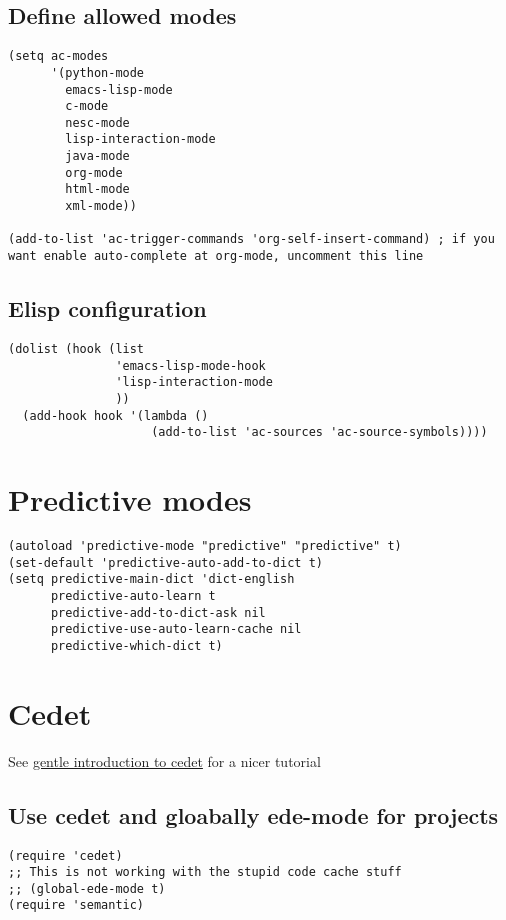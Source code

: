 \documentclass[11pt]{article}
\begin{document}
\subsection{Define allowed modes}
\label{sec-28.4}

\begin{verbatim}
(setq ac-modes 
      '(python-mode
        emacs-lisp-mode
        c-mode
        nesc-mode
        lisp-interaction-mode
        java-mode
        org-mode
        html-mode
        xml-mode))

(add-to-list 'ac-trigger-commands 'org-self-insert-command) ; if you want enable auto-complete at org-mode, uncomment this line
\end{verbatim}
\subsection{Elisp configuration}
\label{sec-28.5}

\begin{verbatim}
(dolist (hook (list
               'emacs-lisp-mode-hook
               'lisp-interaction-mode
               ))
  (add-hook hook '(lambda ()
                    (add-to-list 'ac-sources 'ac-source-symbols))))
\end{verbatim}
\section{Predictive modes}
\label{sec-29}

\begin{verbatim}
(autoload 'predictive-mode "predictive" "predictive" t)
(set-default 'predictive-auto-add-to-dict t)
(setq predictive-main-dict 'dict-english
      predictive-auto-learn t
      predictive-add-to-dict-ask nil
      predictive-use-auto-learn-cache nil
      predictive-which-dict t)
\end{verbatim}
\section{Cedet}
\label{sec-30}

  See \href{http://alexott.net/en/writings/emacs-devenv/EmacsCedet.html}{gentle introduction to cedet} for a nicer tutorial
\subsection{Use cedet and gloabally ede-mode for projects}
\label{sec-30.1}

\begin{verbatim}
(require 'cedet)
;; This is not working with the stupid code cache stuff
;; (global-ede-mode t)
(require 'semantic)
\end{verbatim}
\end{document}
